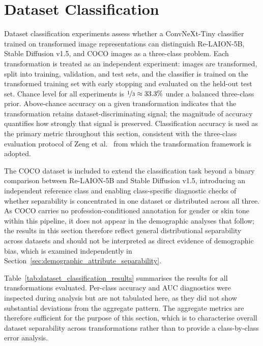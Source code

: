 \section{Dataset Classification}

Dataset classification experiments assess whether a ConvNeXt-Tiny classifier trained on transformed image representations can distinguish Re-LAION-5B, Stable Diffusion v1.5, and COCO images as a three-class problem. Each transformation is treated as an independent experiment: images are transformed, split into training, validation, and test sets, and the classifier is trained on the transformed training set with early stopping and evaluated on the held-out test set. Chance level for all experiments is $\nicefrac{1}{3} \approx 33.3\%$ under a balanced three-class prior. Above-chance accuracy on a given transformation indicates that the transformation retains dataset-discriminating signal; the magnitude of accuracy quantifies how strongly that signal is preserved. Classification accuracy is used as the primary metric throughout this section, consistent with the three-class evaluation protocol of Zeng et al.\ \cite{Zeng_2024_UnderstandingBiasinLargeScaleVisualDatasets} from which the transformation framework is adopted.

The COCO dataset is included to extend the classification task beyond a binary comparison between Re-LAION-5B and Stable Diffusion v1.5, introducing an independent reference class and enabling class-specific diagnostic checks of whether separability is concentrated in one dataset or distributed across all three. As COCO carries no profession-conditioned annotation for gender or skin tone within this pipeline, it does not appear in the demographic analyses that follow; the results in this section therefore reflect general distributional separability across datasets and should not be interpreted as direct evidence of demographic bias, which is examined independently in Section~\ref{sec:demographic_attribute_separability}.

Table~\ref{tab:dataset_classification_results} summarises the results for all transformations evaluated. Per-class accuracy and AUC diagnostics were inspected during analysis but are not tabulated here, as they did not show substantial deviations from the aggregate pattern. The aggregate metrics are therefore sufficient for the purpose of this section, which is to characterise overall dataset separability across transformations rather than to provide a class-by-class error analysis.

